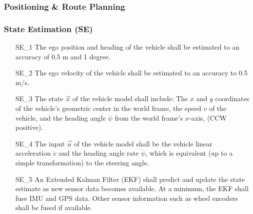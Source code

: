 \subsubsection{Positioning \& Route Planning}
\subsubsection{State Estimation (SE)}
    \begin{itemize}
        \item[SE\_1] The ego position and heading of the vehicle shall be estimated to an accuracy of 0.5 m and 1 degree.
        \item[SE\_2] The ego velocity of the vehicle shall be estimated to an accuracy to 0.5 m/s.
        \item[SE\_3] The state $\vec{x}$ of the vehicle model shall include: The $x$ and $y$ coordinates of the vehicle's geometric center in the world frame, the speed $v$ of the vehicle, and the heading angle $\psi$ from the world frame's $x$-axis, (CCW positive).
        \item[SE\_4] The input $\vec{u}$ of the vehicle model shall be the vehicle linear acceleration $\dot{v}$ and the heading angle rate $\dot{\psi}$, which is equivalent (up to a simple transformation) to the steering angle.
        \item[SE\_5] An Extended Kalman Filter (EKF) shall predict and update the state estimate as new sensor data becomes available. At a minimum, the EKF shall fuse IMU and GPS data. Other sensor information such as wheel encoders shall be fused if available.
    \end{itemize}

